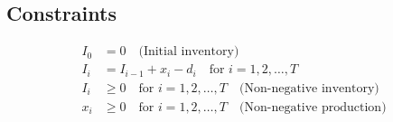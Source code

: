 \documentclass{article}
\begin{document}
\subsection*{Constraints}
\begin{align*}
I_0 & = 0 \quad \text{(Initial inventory)} \\
I_i & = I_{i-1} + x_i - d_i \quad \text{for } i = 1, 2, \ldots, T \\
I_i & \geq 0 \quad \text{for } i = 1, 2, \ldots, T \quad \text{(Non-negative inventory)} \\
x_i & \geq 0 \quad \text{for } i = 1, 2, \ldots, T \quad \text{(Non-negative production)} \\
\end{align*}
\end{document}
